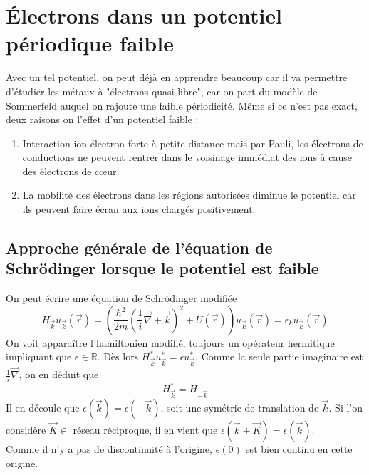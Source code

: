 \chapter{Électrons dans un potentiel périodique faible}
Avec un tel potentiel, on peut déjà en apprendre beaucoup car il 
va permettre d'étudier les métaux à "électrons quasi-libre", car 
on part du modèle de Sommerfeld auquel on rajoute une faible 
périodicité. Même si ce n'est pas exact, deux raisons on l'effet 
d'un potentiel faible :
\begin{enumerate}
\item Interaction ion-électron forte à petite distance mais par 
Pauli, les électrons de conductions ne peuvent rentrer dans le 
voisinage immédiat des ions à cause des électrons de cœur.
\item La mobilité des électrons dans les régions autorisées 
diminue le potentiel car ils peuvent faire écran aux ions 
chargés positivement.
\end{enumerate}

	\section{Approche générale de l'équation de Schrödinger 
	lorsque le potentiel est faible}
	On peut écrire une équation de Schrödinger modifiée 
	\begin{equation}
	H_{\vec{k}}u_{\vec{k}}(\vec{r}) = \left(\frac{\hbar^2}{2m}
	\left(\frac{1}{i}\vec{\nabla}+\vec{k}\right)^2 + U(\vec{r})
	\right)u_{\vec{k}}(\vec{r}) = \epsilon_ku_{\vec{k}}(\vec{r})
	\end{equation}
	On voit apparaître l'hamiltonien modifié, toujours un 
	opérateur hermitique impliquant que $\epsilon\in\mathbb{R}$. 
	Dès lors $H_{\vec{k}}^*u_{\vec{k}}^* = \epsilon u_{\vec{k}}^*$. 
	Comme la seule partie imaginaire est $\frac{1}{i}\vec{\nabla}$, 
	on en déduit que 
	\begin{equation}
	H_{\vec{k}}^* = H_{-\vec{k}}
	\end{equation}
	Il en découle que $\epsilon(\vec{k}) = \epsilon(-\vec{k})$, soit 
	une symétrie de translation de $\vec{k}$. Si l'on considère 
	$\vec{K} \in $ réseau réciproque, il en vient que $\epsilon(\vec{k}
	\pm\vec{K}) = \epsilon(\vec{k})$.\\
	Comme il n'y a pas de discontinuité à l'origine, $\epsilon(0)$ 
	est bien continu en cette origine.\\
	
